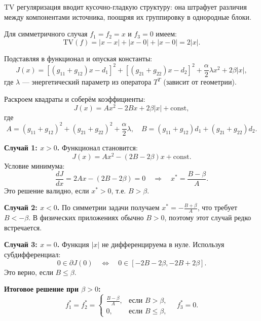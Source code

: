 \documentclass[sn-mathphys-num]{bst/sn-jnl}
\theoremstyle{thmstylethree}
\theoremstyle{thmstyletwo}
\theoremstyle{thmstyleone}
\begin{document}
TV регуляризация вводит кусочно-гладкую структуру: она штрафует различия между компонентами источника, поощряя их группировку в однородные блоки.

Для симметричного случая $f_1 = f_2 = x$ и $f_3 = 0$ имеем:
\begin{equation}
    \mathrm{TV}(f) = |x-x| + |x-0| + |x-0| = 2|x|.
\end{equation}

Подставляя в функционал и опуская константы:
\begin{equation}
    J(x) = \left[(g_{11}+g_{12})x - d_1\right]^2 + \left[(g_{21}+g_{22})x - d_2\right]^2 + \frac{\alpha}{2} \lambda x^2 + 2\beta|x|,
\end{equation}
где $\lambda$ — энергетический параметр из оператора $T^T$ (зависит от геометрии).

Раскроем квадраты и соберём коэффициенты:
\begin{equation}
    J(x) = A x^2 - 2B x + 2\beta|x| + \text{const},
\end{equation}
где
\begin{equation}
    A = (g_{11}+g_{12})^2 + (g_{21}+g_{22})^2 + \frac{\alpha}{2} \lambda, \quad B = (g_{11}+g_{12})d_1 + (g_{21}+g_{22})d_2.
\end{equation}

\textbf{Случай 1: $x > 0$.} Функционал становится:
\begin{equation}
    J(x) = A x^2 - (2B - 2\beta) x + \text{const}.
\end{equation}
Условие минимума:
\begin{equation}
    \frac{dJ}{dx} = 2A x - (2B - 2\beta) = 0 \quad \Rightarrow \quad x^* = \frac{B - \beta}{A}.
\end{equation}
Это решение валидно, если $x^* > 0$, т.е. $B > \beta$.

\textbf{Случай 2: $x < 0$.} По симметрии задачи получаем $x^* = -\frac{B + \beta}{A}$, что требует $B < -\beta$. В физических приложениях обычно $B > 0$, поэтому этот случай редко встречается.

\textbf{Случай 3: $x = 0$.} Функция $|x|$ не дифференцируема в нуле. Используя субдифференциал:
\begin{equation}
    0 \in \partial J(0) \quad \Leftrightarrow \quad 0 \in [-2B - 2\beta, -2B + 2\beta].
\end{equation}
Это верно, если $B \leq \beta$.

\textbf{Итоговое решение при $\beta > 0$:}
\begin{equation}
    f^*_1 = f^*_2 = \begin{cases}
    \frac{B - \beta}{A}, & \text{если } B > \beta, \\[6pt]
    0, & \text{если } B \leq \beta,
    \end{cases} \quad f^*_3 = 0.
\end{equation}
\end{document}
